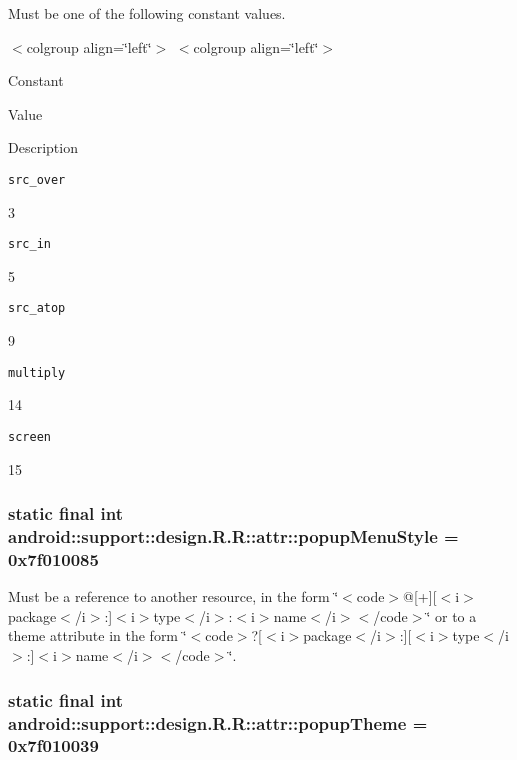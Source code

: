 Must be one of the following constant values. \begin{TabularC}{0}
\hline
\end{TabularC}
$<$colgroup align=\char`\"{}left\char`\"{}$>$ $<$colgroup align=\char`\"{}left\char`\"{}$>$ 

Constant

Value

Description 

{\tt src\_\-over}

3

{\tt src\_\-in}

5

{\tt src\_\-atop}

9

{\tt multiply}

14

{\tt screen}

15\hypertarget{classandroid_1_1support_1_1design_1_1_r_1_1attr_5170e597348aa4102be5fc3e5a63cdb7}{
\subsubsection[{popupMenuStyle}]{\setlength{\rightskip}{0pt plus 5cm}static final int android::support::design.R.R::attr::popupMenuStyle = 0x7f010085}}
\label{classandroid_1_1support_1_1design_1_1_r_1_1attr_5170e597348aa4102be5fc3e5a63cdb7}


Must be a reference to another resource, in the form \char`\"{}$<$code$>$@\mbox{[}+\mbox{]}\mbox{[}$<$i$>$package$<$/i$>$:\mbox{]}$<$i$>$type$<$/i$>$:$<$i$>$name$<$/i$>$$<$/code$>$\char`\"{} or to a theme attribute in the form \char`\"{}$<$code$>$?\mbox{[}$<$i$>$package$<$/i$>$:\mbox{]}\mbox{[}$<$i$>$type$<$/i$>$:\mbox{]}$<$i$>$name$<$/i$>$$<$/code$>$\char`\"{}. \hypertarget{classandroid_1_1support_1_1design_1_1_r_1_1attr_d08e99ee874c577239a4b395ee1871b9}{
\subsubsection[{popupTheme}]{\setlength{\rightskip}{0pt plus 5cm}static final int android::support::design.R.R::attr::popupTheme = 0x7f010039}}
\label{classandroid_1_1support_1_1design_1_1_r_1_1attr_d08e99ee874c577239a4b395ee1871b9}


